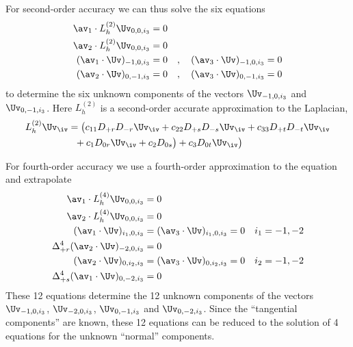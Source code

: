 \documentclass[10pt]{article}
\begin{document}
For second-order accuracy we can thus solve the six equations 
\begin{align*}
  \av_1\cdot L_h^{(2)} \Uv_{0,0,i_3} &= 0 \\
  \av_2\cdot L_h^{(2)} \Uv_{0,0,i_3} &=0 \\
  (\av_1\cdot\Uv)_{-1,0,i_3} &= 0 \quad,\quad (\av_3\cdot\Uv)_{-1,0,i_3} = 0 \\
  (\av_2\cdot\Uv)_{0,-1,i_3} &= 0 \quad,\quad (\av_3\cdot\Uv)_{0,-1,i_3} = 0 
\end{align*}
to determine the six unknown components of the vectors $\Uv_{-1,0,i_3}$ and $\Uv_{0,-1,i_3}$.
Here $L_h^{(2)}$ is a second-order accurate approximation to the Laplacian,
\begin{align*}
  L_h^{(2)} \Uv_\iv &= \big(c_{11} D_{+r}D_{-r} \Uv_\iv + c_{22} D_{+s}D_{-s} \Uv_\iv + c_{33} D_{+t}D_{-t} \Uv_\iv \\
          &~~ + c_{1} D_{0r} \Uv_\iv + c_{2} D_{0s}\big) + c_{3} D_{0t}\Uv_\iv \big) 
\end{align*}

For fourth-order accuracy we use a fourth-order approximation to the equation and extrapolate 
\begin{align*}
  \av_1\cdot L_h^{(4)} \Uv_{0,0,i_3} &=0 \\
  \av_2\cdot L_h^{(4)} \Uv_{0,0,i_3} &=0 \\
  (\av_1\cdot\Uv)_{i_1,0,i_3} &= (\av_3\cdot\Uv)_{i_1,0,i_3} = 0 \quad i_1=-1,-2\\
  \Delta_{+r}^4(\av_2\cdot\Uv)_{-2,0,i_3} &= 0  \\
  (\av_2\cdot\Uv)_{0,i_2,i_3} &= (\av_3\cdot\Uv)_{0,i_2,i_3} = 0  \quad i_2=-1,-2\\
  \Delta_{+s}^4(\av_1\cdot\Uv)_{0,-2,i_3} &= 0  \\
\end{align*}
These 12 equations determine the 12 unknown components of the 
vectors $\Uv_{-1,0,i_3}$, $\Uv_{-2,0,i_3}$, $\Uv_{0,-1,i_3}$ and $\Uv_{0,-2,i_3}$.
Since the ``tangential components'' are known, these 12 equations can be reduced to
the solution of 4 equations for the unknown ``normal'' components.


\clearpage
\end{document}

